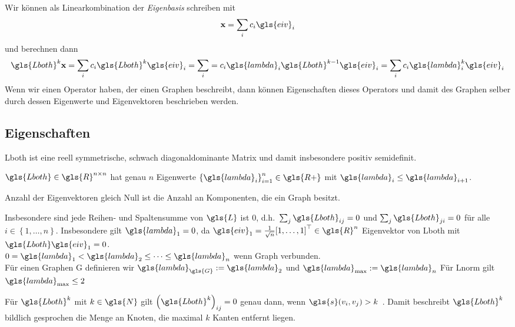 Wir können  als Linearkombination der \emph{Eigenbasis} schreiben mit
\begin{equation}
  \ve{x} = \sum_i c_i \gls{eiv}_i
\end{equation}
und berechnen dann
\begin{equation}
  \gls{Lboth}^k \ve{x} = \sum_i c_i \gls{Lboth}^k \gls{eiv}_i = \sum_i = c_i \gls{lambda}_i \gls{Lboth}^{k-1} \gls{eiv}_i = \sum_i c_i \gls{lambda}_i^k \gls{eiv}_i
\end{equation}
Wenn wir einen Operator haben, der einen Graphen beschreibt, dann können Eigenschaften dieses Operators und damit des Graphen selber durch dessen Eigenwerte und Eigenvektoren beschrieben werden.

\subsection{Eigenschaften}

\gls{Lboth} ist eine reell symmetrische, schwach diagonaldominante Matrix und damit insbesondere positiv semidefinit.

$\gls{Lboth} \in \gls{R}^{n \times n}$ hat genau $n$ Eigenwerte ${\left\{\gls{lambda}_i\right\}}_{i = 1}^n \in \gls{R+}$ mit $\gls{lambda}_i \leq \gls{lambda}_{i+1}$.

Anzahl der Eigenvektoren gleich Null ist die Anzahl an Komponenten, die ein Graph besitzt.

Insbesondere sind jede Reihen- und Spaltensumme von $\gls{L}$ ist $0$, d.h.\ $\sum_j \gls{Lboth}_{ij} = 0$ und $\sum_j \gls{Lboth}_{ji} = 0$ für alle $i \in \left\{1, \ldots, n\right\}$.
Insbesondere gilt $\gls{lambda}_1 = 0$, da $\gls{eiv}_1 = \frac{1}{\sqrt{n}}{\left[1, \ldots, 1\right]}^{\top} \in \gls{R}^n$ Eigenvektor von \gls{Lboth} mit $\gls{Lboth}\gls{eiv}_1 = 0$.\\

$0 = \gls{lambda}_1 < \gls{lambda}_2 \leq \cdots \leq \gls{lambda}_n$ wenn Graph verbunden.\\

Für einen Graphen \gls{G} definieren wir $\gls{lambda}_{\gls{G}} := \gls{lambda}_2$ und $\gls{lambda}_{\max} := \gls{lambda}_n$
Für \gls{Lnorm} gilt $\gls{lambda}_{\max} \leq 2$

Für $\gls{Lboth}^{k}$ mit $k \in \gls{N}$ gilt ${\left(\gls{Lboth}^k\right)}_{ij} = 0$ genau dann, wenn $\gls{s}\left(v_i, v_j\right) > k$~\cite{Hammond}.
Damit beschreibt $\gls{Lboth}^k$ bildlich gesprochen die Menge an Knoten, die maximal $k$ Kanten entfernt liegen.

